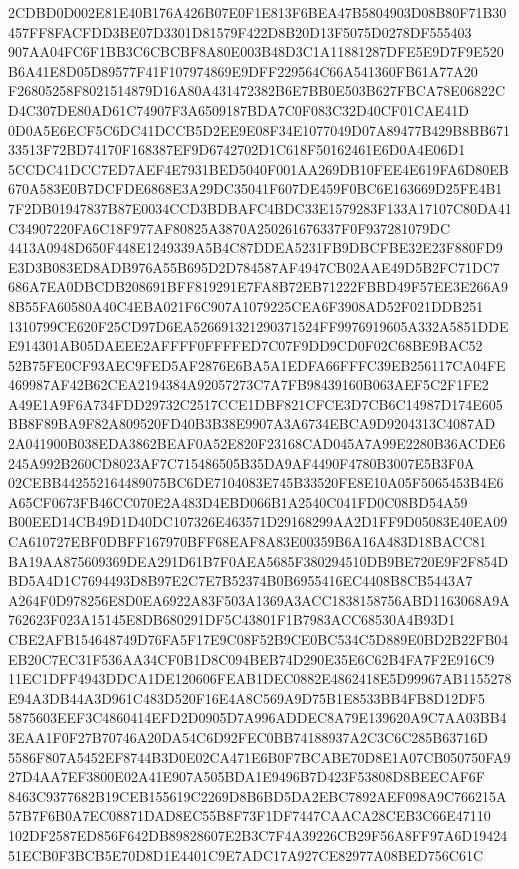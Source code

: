 \documentclass[UTF8,fontset=fandol,zihao=-4,a4paper]{ctexart}
\begin{document}
{{2CDBD0D002E81E40B176A426B07E0F1E813F6BEA47B5804903D08B80F71B30457FF8FACFDD3BE07D3301D81579F422D8B20D13F5075D0278DF555403
907AA04FC6F1BB3C6CBCBF8A80E003B48D3C1A11881287DFE5E9D7F9E520B6A41E8D05D89577F41F107974869E9DFF229564C66A541360FB61A77A20
F26805258F8021514879D16A80A431472382B6E7BB0E503B627FBCA78E06822CD4C307DE80AD61C74907F3A6509187BDA7C0F083C32D40CF01CAE41D
0D0A5E6ECF5C6DC41DCCB5D2EE9E08F34E1077049D07A89477B429B8BB67133513F72BD74170F168387EF9D6742702D1C618F50162461E6D0A4E06D1
5CCDC41DCC7ED7AEF4E7931BED5040F001AA269DB10FEE4E619FA6D80EB670A583E0B7DCFDE6868E3A29DC35041F607DE459F0BC6E163669D25FE4B1
7F2DB01947837B87E0034CCD3BDBAFC4BDC33E1579283F133A17107C80DA41C34907220FA6C18F977AF80825A3870A250261676337F0F937281079DC
4413A0948D650F448E1249339A5B4C87DDEA5231FB9DBCFBE32E23F880FD9E3D3B083ED8ADB976A55B695D2D784587AF4947CB02AAE49D5B2FC71DC7
686A7EA0DBCDB208691BFF819291E7FA8B72EB71222FBBD49F57EE3E266A98B55FA60580A40C4EBA021F6C907A1079225CEA6F3908AD52F021DDB251
1310799CE620F25CD97D6EA526691321290371524FF9976919605A332A5851DDEE914301AB05DAEEE2AFFFF0FFFFED7C07F9DD9CD0F02C68BE9BAC52
52B75FE0CF93AEC9FED5AF2876E6BA5A1EDFA66FFFC39EB256117CA04FE469987AF42B62CEA2194384A92057273C7A7FB98439160B063AEF5C2F1FE2
A49E1A9F6A734FDD29732C2517CCE1DBF821CFCE3D7CB6C14987D174E605BB8F89BA9F82A809520FD40B3B38E9907A3A6734EBCA9D9204313C4087AD
2A041900B038EDA3862BEAF0A52E820F23168CAD045A7A99E2280B36ACDE6245A992B260CD8023AF7C715486505B35DA9AF4490F4780B3007E5B3F0A
02CEBB442552164489075BC6DE7104083E745B33520FE8E10A05F5065453B4E6A65CF0673FB46CC070E2A483D4EBD066B1A2540C041FD0C08BD54A59
B00EED14CB49D1D40DC107326E463571D29168299AA2D1FF9D05083E40EA09CA610727EBF0DBFF167970BFF68EAF8A83E00359B6A16A483D18BACC81
BA19AA875609369DEA291D61B7F0AEA5685F380294510DB9BE720E9F2F854DBD5A4D1C7694493D8B97E2C7E7B52374B0B6955416EC4408B8CB5443A7
A264F0D978256E8D0EA6922A83F503A1369A3ACC1838158756ABD1163068A9A762623F023A15145E8DB680291DF5C43801F1B7983ACC68530A4B93D1
CBE2AFB154648749D76FA5F17E9C08F52B9CE0BC534C5D889E0BD2B22FB04EB20C7EC31F536AA34CF0B1D8C094BEB74D290E35E6C62B4FA7F2E916C9
11EC1DFF4943DDCA1DE120606FEAB1DEC0882E4862418E5D99967AB1155278E94A3DB44A3D961C483D520F16E4A8C569A9D75B1E8533BB4FB8D12DF5
5875603EEF3C4860414EFD2D0905D7A996ADDEC8A79E139620A9C7AA03BB43EAA1F0F27B70746A20DA54C6D92FEC0BB74188937A2C3C6C285B63716D
5586F807A5452EF8744B3D0E02CA471E6B0F7BCABE70D8E1A07CB050750FA927D4AA7EF3800E02A41E907A505BDA1E9496B7D423F53808D8BEECAF6F
8463C9377682B19CEB155619C2269D8B6BD5DA2EBC7892AEF098A9C766215A57B7F6B0A7EC08871DAD8EC55B8F73F1DF7447CAACA28CEB3C66E47110
102DF2587ED856F642DB89828607E2B3C7F4A39226CB29F56A8FF97A6D1942451ECB0F3BCB5E70D8D1E4401C9E7ADC17A927CE82977A08BED756C61C
}}
\end{document}
